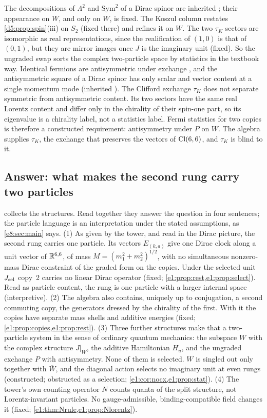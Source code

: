The decompositions of $\Lambda^2$ and $\mathrm{Sym}^2$ of a Dirac spinor are inherited \cite{WeinbergQFT}; their appearance on $W$, and only on $W$,
is fixed. The Koszul column restates \cref{d5:prop:spin}(iii) on $S_2$ (fixed there) and refines it on $W$. The two $\tau_K$
sectors are isomorphic as real representations, since the realification of $(1,0)$ is that of $(0,1)$, but they are mirror images once $J$ is
the imaginary unit (fixed). So the ungraded swap sorts the complex two-particle space by statistics in the textbook way. Identical fermions
are antisymmetric under exchange \cite{Pauli40}, and the antisymmetric square of a Dirac spinor has only scalar and vector content at a single
momentum mode (inherited \cite{WeinbergQFT}). The Clifford exchange $\tau_K$ does not separate symmetric from antisymmetric content. Its two
sectors have the same real Lorentz content and differ only in the chirality of their spin-one part, so its eigenvalue is a chirality label,
not a statistics label. Fermi statistics
for two copies is therefore a constructed requirement: antisymmetry under $P$ on $W$. The algebra supplies $\tau_K$, the exchange that
preserves the vectors of $\mathrm{Cl}(6,6)$, and $\tau_K$ is blind to it.

\subsection{Answer: what makes the second rung carry two particles}
\label{e1:sec:answer}

 collects the structures. Read together they answer the question in four sentences; the particle language is an
interpretation under the stated assumptions, as \cref{e8:sec:main} says. (1) As given by the tower, and read in the Dirac picture, the second
rung carries one particle. Its vectors $E_{(k,a)}$ give one Dirac clock along a unit vector of $\mathbb{R}^{6,6}$, of mass $M=(m_1^2+m_2^2)^{1/2}$, with
no simultaneous nonzero-mass Dirac constraint of the graded form on the copies. Under the selected unit $J_{\rm sel}$ copy~2 carries no linear Dirac operator (fixed;
\cref{e1:prop:rest,e1:prop:select}). Read as particle content, the rung is one particle with a larger internal space (interpretive). (2) The algebra also contains, uniquely up to
conjugation, a second commuting copy, the generators dressed by the chirality of the first. With it the copies have separate mass shells and
additive energies (fixed; \cref{e1:prop:copies,e1:prop:rest}). (3) Three further structures make that a two-particle system in the sense of
ordinary quantum mechanics: the subspace $W$ with the complex structure $J|_W$, the additive Hamiltonian $H_u$, and the ungraded exchange $P$
with antisymmetry. None of them is selected. $W$ is singled out only together with $\overline W$, and the diagonal action selects no imaginary unit at
even rungs (constructed; obstructed as a selection; \cref{e1:cor:nocx,e1:prop:stat}). (4) The tower's own counting operator $N$ counts quanta
of the split structure, not Lorentz-invariant particles. No gauge-admissible, binding-compatible field changes it (fixed;
\cref{e1:thm:Nrule,e1:prop:Nlorentz}).

